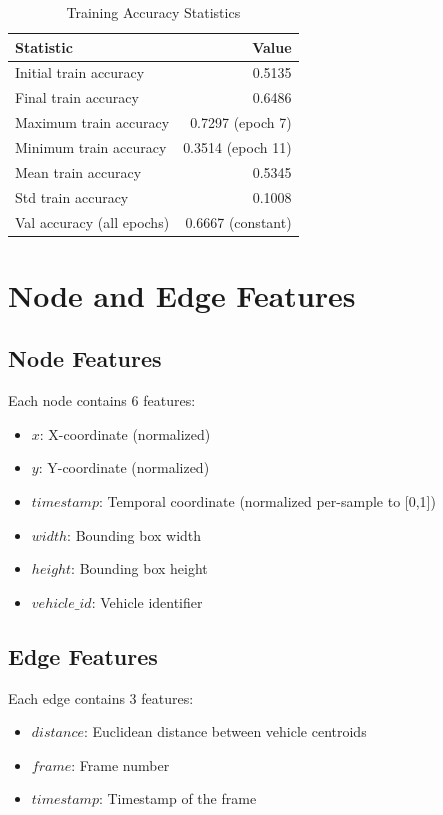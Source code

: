 \documentclass[11pt,a4paper]{article}
\begin{document}
\begin{table}[H]
\centering
\caption{Training Accuracy Statistics}
\begin{tabular}{lr}
\toprule
\textbf{Statistic} & \textbf{Value} \\
\midrule
Initial train accuracy & 0.5135 \\
Final train accuracy & 0.6486 \\
Maximum train accuracy & 0.7297 (epoch 7) \\
Minimum train accuracy & 0.3514 (epoch 11) \\
Mean train accuracy & 0.5345 \\
Std train accuracy & 0.1008 \\
\midrule
Val accuracy (all epochs) & 0.6667 (constant) \\
\bottomrule
\end{tabular}
\end{table}

\section{Node and Edge Features}

\subsection{Node Features}
Each node contains 6 features:
\begin{itemize}
    \item $x$: X-coordinate (normalized)
    \item $y$: Y-coordinate (normalized)
    \item $timestamp$: Temporal coordinate (normalized per-sample to [0,1])
    \item $width$: Bounding box width
    \item $height$: Bounding box height
    \item $vehicle\_id$: Vehicle identifier
\end{itemize}

\subsection{Edge Features}
Each edge contains 3 features:
\begin{itemize}
    \item $distance$: Euclidean distance between vehicle centroids
    \item $frame$: Frame number
    \item $timestamp$: Timestamp of the frame
\end{itemize}
\end{document}
